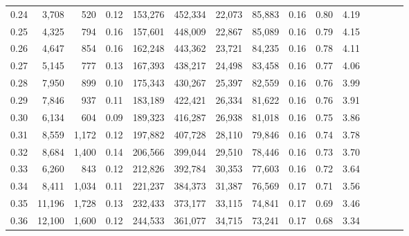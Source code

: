 \begin{tabular}{rrrcrrrrrrrrrrr}
0.24 &   3,708 &     520 &                                       0.12 &  153,276 &  452,334 &   22,073 &  85,883 &  0.16 &  0.80 &                         4.19 \\
0.25 &   4,325 &     794 &                                       0.16 &  157,601 &  448,009 &   22,867 &  85,089 &  0.16 &  0.79 &                         4.15 \\
0.26 &   4,647 &     854 &                                       0.16 &  162,248 &  443,362 &   23,721 &  84,235 &  0.16 &  0.78 &                         4.11 \\
0.27 &   5,145 &     777 &                                       0.13 &  167,393 &  438,217 &   24,498 &  83,458 &  0.16 &  0.77 &                         4.06 \\
0.28 &   7,950 &     899 &                                       0.10 &  175,343 &  430,267 &   25,397 &  82,559 &  0.16 &  0.76 &                         3.99 \\
0.29 &   7,846 &     937 &                                       0.11 &  183,189 &  422,421 &   26,334 &  81,622 &  0.16 &  0.76 &                         3.91 \\
0.30 &   6,134 &     604 &                                       0.09 &  189,323 &  416,287 &   26,938 &  81,018 &  0.16 &  0.75 &                         3.86 \\
0.31 &   8,559 &   1,172 &                                       0.12 &  197,882 &  407,728 &   28,110 &  79,846 &  0.16 &  0.74 &                         3.78 \\
0.32 &   8,684 &   1,400 &                                       0.14 &  206,566 &  399,044 &   29,510 &  78,446 &  0.16 &  0.73 &                         3.70 \\
0.33 &   6,260 &     843 &                                       0.12 &  212,826 &  392,784 &   30,353 &  77,603 &  0.16 &  0.72 &                         3.64 \\
0.34 &   8,411 &   1,034 &                                       0.11 &  221,237 &  384,373 &   31,387 &  76,569 &  0.17 &  0.71 &                         3.56 \\
0.35 &  11,196 &   1,728 &                                       0.13 &  232,433 &  373,177 &   33,115 &  74,841 &  0.17 &  0.69 &                         3.46 \\
0.36 &  12,100 &   1,600 &                                       0.12 &  244,533 &  361,077 &   34,715 &  73,241 &  0.17 &  0.68 &                         3.34 \\

\end{tabular}
